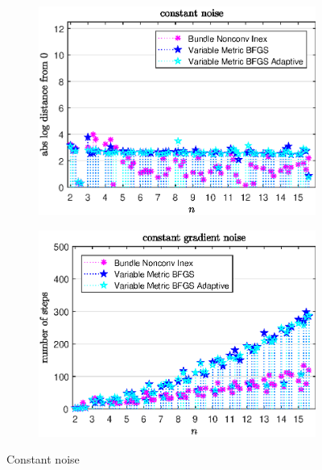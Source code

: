 \begin{figure}[ht]
	\begin{subfigure}{0.49\textwidth}
		\includegraphics[width=\textwidth]{Pictures/Plots/constant_noise2.eps}%
	\end{subfigure}
	\begin{subfigure}{0.49\textwidth}
		\includegraphics[width=\textwidth]{Pictures/Plots/steps_constant_noise2.eps}%
	\end{subfigure}
	\caption{Constant noise}%
	\label{fig_const_noise}%
\end{figure}

